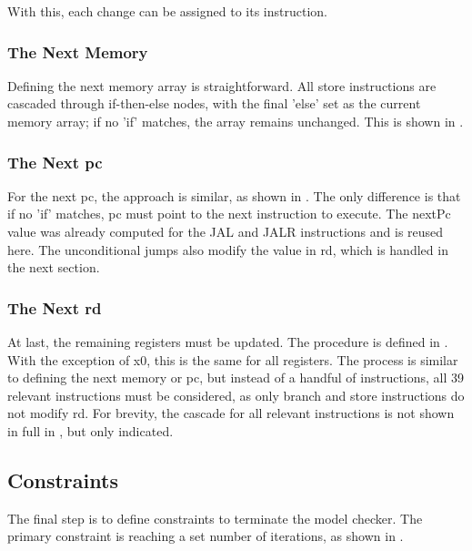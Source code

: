 With this, each change can be assigned to its instruction.



\subsubsection{The Next Memory}
Defining the next memory array is straightforward. All store
instructions are cascaded through if-then-else nodes, with the final
'else' set as the current memory array; if no 'if' matches, the array
remains unchanged. This is shown in .



\subsubsection{The Next pc}
For the next pc, the approach is similar, as shown in
. The only difference is that if no 'if' matches,
pc must point to the next instruction to execute. The nextPc value
was already computed for the JAL and JALR instructions and is reused
here. The unconditional jumps also modify the value in rd, which is
handled in the next section.



\subsubsection{The Next rd}
At last, the remaining registers must be updated. The procedure is
defined in . With the exception of x0, this is the
same for all registers. The process is similar to defining the next
memory or pc, but instead of a handful of instructions, all 39
relevant instructions must be considered, as only branch and store
instructions do not modify rd. For brevity, the cascade for all
relevant instructions is not shown in full in ,
but only indicated.



\subsection{Constraints}
The final step is to define constraints to terminate the model
checker. The primary constraint is reaching a set number of
iterations, as shown in .

